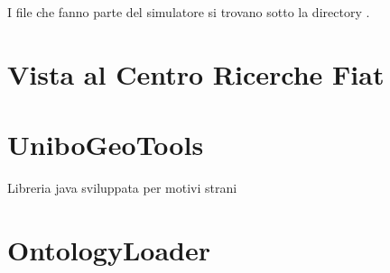 I file che fanno parte del simulatore si trovano sotto la directory . 

\chapter{Vista al Centro Ricerche Fiat}\label{app:crf}

\chapter{UniboGeoTools}\label{app:unibo-geo-tools}

Libreria java sviluppata per motivi strani

\chapter{OntologyLoader}\label{app:ontology-loader}
